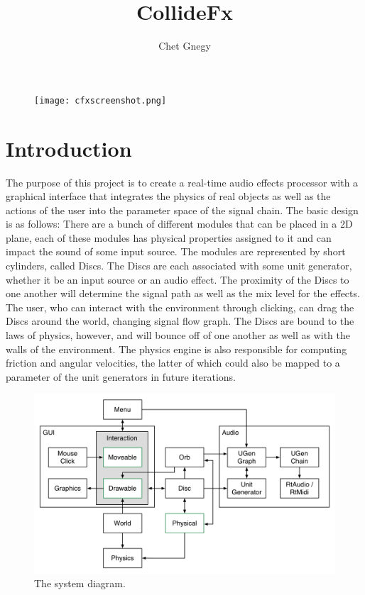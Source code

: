 \documentclass[pdftext,twoside,10pt]{article}
\title{CollideFx}
\author{Chet Gnegy}
\begin{document}
\maketitle

\begin{figure}[h!]
  \centering
    \texttt{[image: cfxscreenshot.png]}

\end{figure}


\section{Introduction}
The purpose of this project is to create a real-time audio effects processor with a graphical interface that integrates the physics of real objects as well as the actions of the user into the parameter space of the signal chain. The basic design is as follows: There are a bunch of different modules that can be placed in a 2D plane, each of these modules has physical properties assigned to it and can impact the sound of some input source. The modules are represented by short cylinders, called Discs. The Discs are each associated with some unit generator, whether it be an input source or an audio effect. The proximity of the Discs to one another will determine the signal path as well as the mix level for the effects. The user, who can interact with the environment through clicking, can drag the Discs around the world, changing signal flow graph. The Discs are bound to the laws of physics, however, and will bounce off of one another as well as with the walls of the environment. The physics engine is also responsible for computing friction and angular velocities, the latter of which could also be mapped to a parameter of the unit generators in future iterations.

\pagebreak

\begin{figure}[t!]
  \centering
    \includegraphics[width=\textwidth]{flow.png}
    \caption{The system diagram.}
  
\end{figure}
\end{document}
